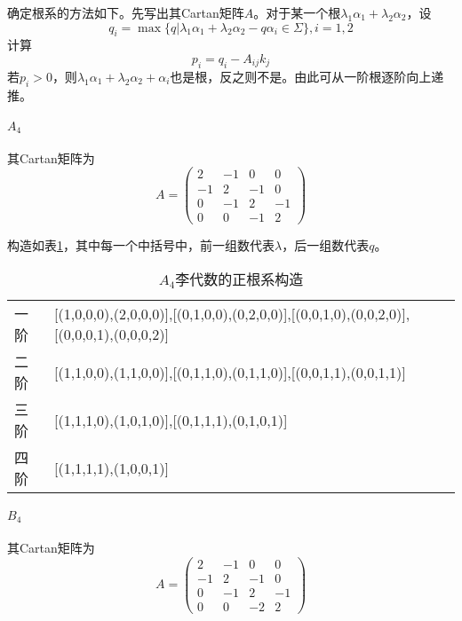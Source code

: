 \documentclass{ctexart}
\begin{document}
	确定根系的方法如下。先写出其Cartan矩阵$A$。对于某一个根$\lambda_1\alpha_1+\lambda_2\alpha_2$，设
	\begin{equation}
	q_i=\max\{q|\lambda_1\alpha_1+\lambda_2\alpha_2-q\alpha_i\in\Sigma\},i=1,2
	\end{equation}
	计算
	\begin{equation}
	p_i=q_i-A_{ij}k_j
	\end{equation}
	若$p_i>0$，则$\lambda_1\alpha_1+\lambda_2\alpha_2+\alpha_i$也是根，反之则不是。由此可从一阶根逐阶向上递推。
	
	\paragraph{$A_4$} 其Cartan矩阵为
	\begin{equation}
	A=
	\begin{pmatrix}
	2 & -1 & 0 & 0\\
	-1 & 2 & -1 & 0 \\
	0 & -1 & 2 & -1 \\
	0 & 0 & -1 & 2
	\end{pmatrix}
	\end{equation}
	
	构造如表\ref{table:A4Roots}，其中每一个中括号中，前一组数代表$\lambda$，后一组数代表$q$。
	
	\begin{table}[!htbp]
		\centering
		\begin{tabular}{ll}
			一阶 & [(1,0,0,0),(2,0,0,0)],[(0,1,0,0),(0,2,0,0)],[(0,0,1,0),(0,0,2,0)],[(0,0,0,1),(0,0,0,2)]\\
			二阶 & [(1,1,0,0),(1,1,0,0)],[(0,1,1,0),(0,1,1,0)],[(0,0,1,1),(0,0,1,1)] \\
			三阶 & [(1,1,1,0),(1,0,1,0)],[(0,1,1,1),(0,1,0,1)] \\
			四阶 & [(1,1,1,1),(1,0,0,1)] \\
		\end{tabular}
		\caption{$A_4$李代数的正根系构造}
		\label{table:A4Roots}
	\end{table}

	
	
	\paragraph{$B_4$} 其Cartan矩阵为
	\begin{equation}
	A=
	\begin{pmatrix}
	2 & -1 & 0 & 0\\
	-1 & 2 & -1 & 0 \\
	0 & -1 & 2 & -1 \\
	0 & 0 & -2 & 2
	\end{pmatrix}
	\end{equation}
	
\end{document}
